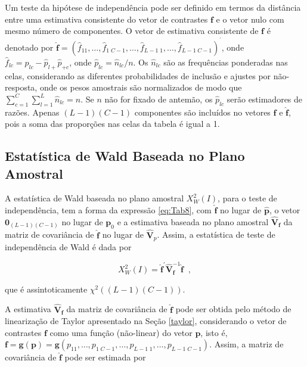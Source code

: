 \documentclass[]{book}
\numberwithin{example}{chapter}
\numberwithin{remark}{chapter}
\numberwithin{definition}{chapter}
\begin{document}
Um teste da hipótese de independência pode ser definido em termos da
distância entre uma estimativa consistente do vetor de contrastes
\(\mathbf{f}\) e o vetor nulo com mesmo número de componentes. O vetor
de estimativa consistente de \(\mathbf{f}\) é denotado por
\(\mathbf{\hat{f}}=\left( \hat{f}_{11},\ldots ,\hat{f}_{1\;C-1},\ldots ,\hat{f} _{L-1\;1},\ldots ,\hat{f}_{L-1\;C-1}\right) ^{^{\prime }}\),
onde \(\hat{f} _{lc}=\hat{p}_{lc}-\hat{p}_{l+}\hat{p}_{+c}\), onde
\(\hat{p}_{lc}=\hat{n} _{lc}/n\). Os \(\hat{n}_{lc}\) são as frequências
ponderadas nas celas, considerando as diferentes probabilidades de
inclusão e ajustes por não-resposta, onde os pesos amostrais são
normalizados de modo que \(\sum_{c=1}^{C}\sum_{l=1}^{L}\hat{n}_{lc}=n\).
Se \(n\) não for fixado de antemão, os \(\hat{p}_{lc}\) serão
estimadores de razões. Apenas \(\left( L-1\right) \left( C-1\right)\)
componentes são incluídos no vetores \(\mathbf{f}\) e
\(\mathbf{\hat{f}}\), pois a soma das proporções nas celas da tabela é
igual a 1.

\subsection{Estatística de Wald Baseada no Plano
Amostral}\label{estatistica-de-wald-baseada-no-plano-amostral-1}

A estatística de Wald baseada no plano amostral
\(X_{W}^{2}\left(I\right)\), para o teste de independência, tem a forma
da expressão \eqref{eq:Tab8}, com \(\mathbf{\hat{f}}\) no lugar de
\(\mathbf{\hat{p}}\), o vetor
\(\mathbf{0}_{\left( L-1\right)\left( C-1\right)}\) no lugar de
\(\mathbf{p}_{0}\) e a estimativa baseada no plano amostral
\(\mathbf{\hat{V}}_{\mathbf{f}}\) da matriz de covariância de
\(\mathbf{\hat{f}}\) no lugar de \(\mathbf{ \hat{V}}_{p}\). Assim, a
estatística de teste de independência de Wald é dada por

\begin{equation}
X_{W}^{2}\left( I\right) =\mathbf{\hat{f}}^{\prime }\mathbf{\hat{V}}_{
\mathbf{f}}^{-1}\mathbf{\hat{f}\;\;},  \label{eq:Tab10}
\end{equation}

que é assintoticamente
\(\chi ^{2}\left( \left( L-1\right) \left( C-1\right) \right)\).

A estimativa \(\mathbf{\hat{V}}_{\mathbf{f}}\) da matriz de covariância
de \(\mathbf{\hat{f}}\) pode ser obtida pelo método de linearização de
Taylor apresentado na Seção \ref{taylor}, considerando o vetor de
contrastes \(\mathbf{f}\) como uma função (não-linear) do vetor
\(\mathbf{p}\), isto é,
\(\mathbf{f=g}\left( \mathbf{p}\right) \mathbf{=g}\left( p_{11},\ldots ,p_{1\;C-1},\ldots ,p_{L-1\;1},\ldots,p_{L-1\;C-1}\right)\).
Assim, a matriz de covariância de \(\mathbf{\hat{f}}\) pode ser estimada
por
\end{document}
